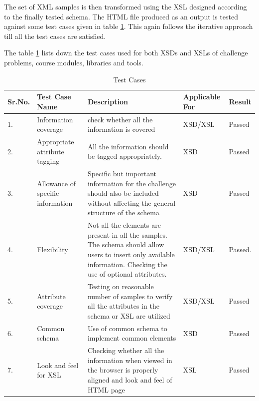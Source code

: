 \documentclass[11pt,letterpaper]{report}
\begin{document}
The set of XML samples is then transformed using the XSL designed according to the finally tested schema. The HTML file produced as an output is tested against some test cases given in table \ref{table:test}. This again follows the iterative approach till all the test cases are satisfied.

The table \ref{table:test} lists down the test cases used for both XSDs and XSLs of challenge problems, course modules, libraries and tools.
\begin{table}
\begin{tabular}{| l | p{2cm} | p{5cm} | p{2cm} | p{1cm} |}
\hline \textbf{Sr.No.} & \textbf{Test Case Name} & \textbf{Description} & \textbf{Applicable For} & \textbf{Result} \\ \hline 1. & Information coverage & check whether all the information is covered & XSD/XSL & Passed \\ 
\hline 2. & Appropriate attribute tagging & All the information should be tagged appropriately.  & XSD & Passed  \\  
\hline 3.& Allowance of specific information  & Specific but important information for the challenge should also be included without affecting the general structure of the schema & XSD & Passed \\ 
\hline 4.& Flexibility & Not all the elements are present in all the samples. The schema should allow users to insert only available information. Checking the use of optional attributes. & XSD/XSL & Passed. \\ 
\hline 5. & Attribute coverage & Testing on reasonable number of samples to verify all the attributes in the schema or XSL are utilized & XSD/XSL & Passed \\  
\hline 6. & Common schema & Use of common schema to implement common elements & XSD & Passed \\  
\hline 7. & Look and feel for XSL & Checking whether all the information when viewed in the browser is properly aligned and look and feel of HTML page & XSL & Passed \\ 
\hline
\end{tabular}
\caption[Table caption text]{Test Cases}
\label{table:test}
\end{table}
\pagebreak
\end{document}
